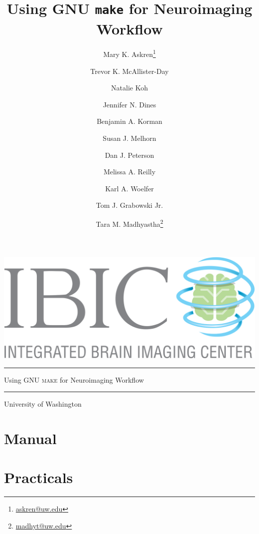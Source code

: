 \documentclass[oneside,11pt]{memoir}
\title{Using GNU \texttt{make} for Neuroimaging Workflow}
\author{Mary K. Askren\thanks{\url{askren@uw.edu}}}
\author{Trevor K. McAllister-Day}
\author{Natalie Koh}
\author{Jennifer N. Dines}
\author{Benjamin A. Korman}
\author{Susan J. Melhorn}
\author{Dan J. Peterson}
\author{Melissa A. Reilly}
\author{Karl A. Woelfer}
\author{Tom J. Grabowski Jr.}
\author{Tara M. Madhyastha\thanks{\url{madhyt@uw.edu}}}
\affil{\textbf{University of Washington, Seattle}}
\begin{document}
	
	
	\thispagestyle{empty}
	\begin{vplace}[0.7]
		\begin{center}
			\includegraphics[width=0.75\linewidth, natwidth=1890, natheight=761]{images/IBIClogo.png}				%
			\vspace{0.25in} \hrule \vspace{0.25in}															%
			{ \fontsize{30pt}{36pt} \selectfont Using GNU \textsc{make} for Neuroimaging Workflow\par }		%
			\vspace{0.25in} \hrule \vspace{0.25in}															%
			{\LARGE University of Washington} 																%
		\end{center}	
	\end{vplace}
		
	
	\frontmatter	%
	
	\maketitle		%
	
	\tableofcontents
	
	\listoffigures
	
	\mainmatter		%
	
	\part{Manual}
	
	
	
	
	
	\part{Practicals}
	
\end{document}

